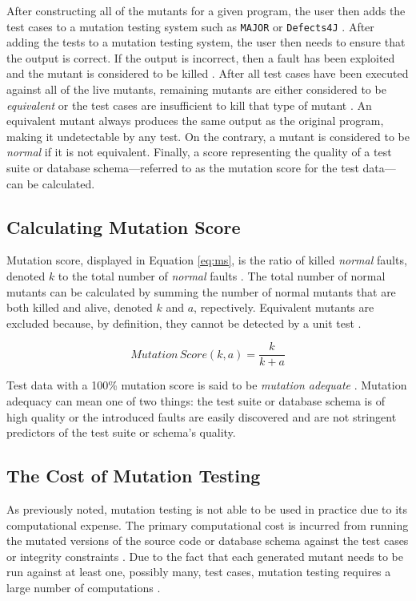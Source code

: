 \documentclass[conference]{IEEEtran}
\begin{document}
After constructing all of the mutants for a given program, the user then adds the test cases
to a mutation testing system such as \texttt{MAJOR} \cite{just2011major} or
\texttt{Defects4J} \cite{just2014defects4j}. After adding the tests to a mutation testing system,
the user then needs to ensure that the output is correct. If the output is incorrect, then
a fault has been exploited and the mutant is considered to be killed \cite{offutt1993experimental}.
After all test cases have been executed against all of the live mutants, remaining mutants are either
considered to be \textit{equivalent} or the test cases are insufficient to kill that type of mutant \cite{gopinath2015empirical}. An equivalent
mutant always produces the same output as the original program, making it undetectable by any test. On the contrary, a mutant
is considered to be \textit{normal} if it is not equivalent.
Finally, a score representing the quality of a test suite or database schema---referred to as the mutation score for the test data---can be calculated.

\subsection{Calculating Mutation Score}
Mutation score, displayed in Equation \ref{eq:ms}, is the ratio of killed \textit{normal} faults, denoted $k$ to the total number of \textit{normal} faults \cite{wright2013efficient}.
The total number of normal mutants can be calculated by summing the number of normal mutants that are both killed and alive, denoted $k$ and $a$, repectively.
Equivalent mutants are excluded because, by definition, they cannot be detected by a unit test \cite{inozemtseva2014coverage}.

\begin{equation}
    Mutation \, Score(k,a) = \frac{k}{k+a}
    \label{eq:ms}
\end{equation}

Test data with a 100\% mutation score is said to be \textit{mutation adequate} \cite{offutt1993experimental}.
Mutation adequacy can mean one of two things: the test suite
or database schema is of high quality or the introduced faults are easily
discovered and are not stringent predictors of the test suite or schema's quality.

\subsection{The Cost of Mutation Testing}
As previously noted, mutation testing is not able
to be used in practice due to its computational expense.
The primary computational cost is incurred from running the mutated versions
of the source code or database schema against the test cases or integrity
constraints \cite{offutt1993experimental}. Due to the fact that each generated
mutant needs to be run against at least one, possibly many, test cases, mutation
testing requires a large number of computations \cite{offutt1993experimental}.
\end{document}
